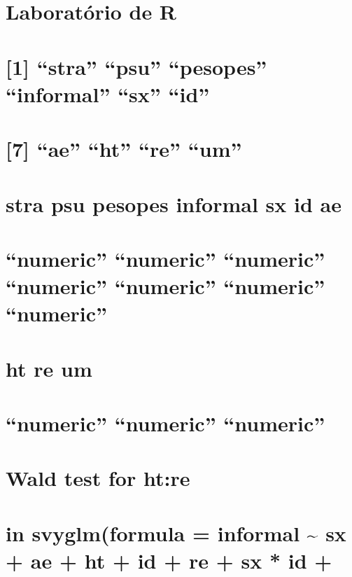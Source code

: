 \documentclass[]{book}
\theoremstyle{definition}
\theoremstyle{definition}
\theoremstyle{definition}
\theoremstyle{remark}
\begin{document}
\section{Laboratório de R}\label{laboratorio-de-r-3}

\section{\texorpdfstring{{[}1{]} ``stra'' ``psu'' ``pesopes''
``informal'' ``sx''
``id''}{{[}1{]} stra psu pesopes informal sx id}}\label{stra-psu-pesopes-informal-sx-id}

\section{\texorpdfstring{{[}7{]} ``ae'' ``ht'' ``re''
``um''}{{[}7{]} ae ht re um}}\label{ae-ht-re-um}

\section{stra psu pesopes informal sx id
ae}\label{stra-psu-pesopes-informal-sx-id-ae}

\section{\texorpdfstring{``numeric'' ``numeric'' ``numeric'' ``numeric''
``numeric'' ``numeric''
``numeric''}{numeric numeric numeric numeric numeric numeric numeric}}\label{numeric-numeric-numeric-numeric-numeric-numeric-numeric}

\section{ht re um}\label{ht-re-um}

\section{\texorpdfstring{``numeric'' ``numeric''
``numeric''}{numeric numeric numeric}}\label{numeric-numeric-numeric}

\section{Wald test for ht:re}\label{wald-test-for-htre}

\section{in svyglm(formula = informal \textasciitilde{} sx + ae + ht +
id + re + sx * id
+}\label{in-svyglmformula-informal-sx-ae-ht-id-re-sx-id}
\end{document}
